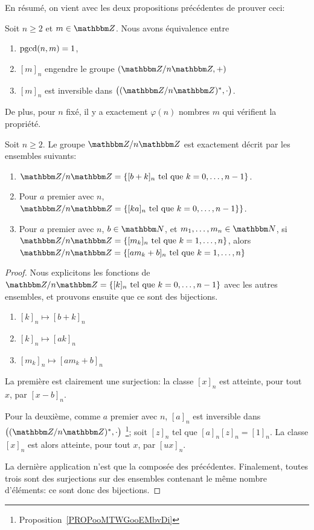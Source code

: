 En résumé, on vient avec les deux propositions précédentes de prouver ceci:

\begin{proposition}       \label{PROPooMTWGooEMbvDi}
    Soit \( n\geq 2\) et \( m\in \eZ\). Nous avons équivalence entre
    \begin{enumerate}
        \item
            \( \operatorname{pgcd}(n,m)=1\),
        \item
            \( [m]_n\) engendre le groupe \( (\eZ/n\eZ,+)\)
        \item
            \( [m]_n\) est inversible dans \( \big( (\eZ/n\eZ)^*,\cdot \big)\).
    \end{enumerate}
    De plus, pour \( n \) fixé, il y a exactement \( \varphi(n) \) nombres \( m \) qui vérifient la propriété.
\end{proposition}

\begin{proposition}       \label{PROPooSKSYooZoDhIP}
    Soit \( n\geq 2\). Le groupe \( \eZ/n\eZ \) est exactement décrit par les ensembles suivants:
    \begin{enumerate}
        \item
            \( \eZ/n\eZ=\{ [b+k]_n \tq k=0,\ldots, n-1\}\).
        \item
            Pour \( a \) premier avec \( n\), \( \eZ/n\eZ=\{ [ka]_n \tq k=0,\ldots, n-1\} \}\).       
        \item
            Pour \( a \) premier avec \( n\), \( b\in \eN\), et \( m_1,\ldots, m_n\in \eN\), si \( \eZ/n\eZ=\{ [m_k]_n \tq k=1,\ldots, n\} \), alors \( \eZ/n\eZ=\{ [am_k+b]_n \tq k=1,\ldots, n\} \)
    \end{enumerate}
\end{proposition}

\begin{proof}
  Nous explicitons les fonctions de \( \eZ/n\eZ=\{ [k]_n \tq k=0,\ldots, n-1\}\) avec les autres ensembles, et prouvons ensuite que ce sont des bijections.
  \begin{enumerate}
    \item
      \( [k]_n \mapsto [b+k]_n \)
    \item
      \( [k]_n \mapsto [ak]_n \)
    \item
      \( [m_k]_n \mapsto [am_k+b]_n \)
  \end{enumerate}
  La première est clairement une surjection: la classe \( [x]_n \) est atteinte, pour tout \( x \), par \( [x - b]_n \).
  
  Pour la deuxième, comme \( a \) premier avec \( n\), \( [a]_n\) est inversible dans \( \big( (\eZ/n\eZ)^*,\cdot \big)\) \footnote{Proposition~\ref{PROPooMTWGooEMbvDi}}; soit \( [z]_n \) tel que \( [a]_n[z]_n = [1]_n \). La classe  \( [x]_n \) est alors atteinte, pour tout \( x \), par \( [ux]_n \).
  
  La dernière application n'est que la composée des précédentes. Finalement, toutes trois sont des surjections sur des ensembles contenant le même nombre d'éléments: ce sont donc des bijections.
\end{proof}

